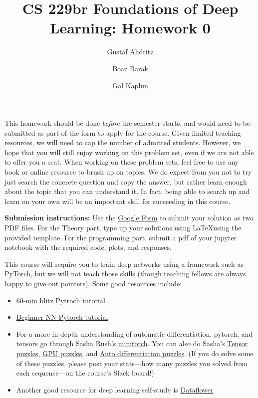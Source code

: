 \documentclass{article}
\title{CS 229br Foundations of Deep Learning: Homework 0}
\author{Gustaf Ahdritz \and Boaz Barak \and Gal Kaplun}
\theoremstyle{definition}
\begin{document}
\date{}
\maketitle{}

This homework should be done \emph{before} the semester starts, and would need to be submitted as part of the form to apply for the course. Given limited teaching resources, we will need to cap the number of admitted students. However, we hope that you will still enjoy working on this problem set, even if we are not able to offer you a seat. When working on these problem sets, feel free to use any book or online resource to brush up on topics. We do expect from you not to try just search the concrete question and copy the answer, but rather learn enough about the topic that you can understand it. In fact, being able to search up and learn on your own will be an important skill for succeeding in this course. 

\medskip 
{\color{blue} \textbf{Submission instructions:} Use the \href{https://forms.gle/gjXbdCVbqxRVu6Bj6}{Google Form} to submit your solution as two PDF files. For the Theory part, type up your solutions using \LaTeX using the provided template. For the programming part, submit a pdf of your jupyter notebook with the required code, plots, and responses.}

\medskip
This course will require you to train deep networks using a framework such as PyTorch, but we will not teach those skills (though teaching fellows are always happy to give out pointers).  Some good resources include:


\begin{itemize}
    \item \href{https://pytorch.org/tutorials/beginner/deep_learning_60min_blitz.html}{60-min blitz} Pytroch tutorial
    \item \href{https://pytorch.org/tutorials/beginner/nn_tutorial.html}{Beginner NN Pytorch tutorial}

    \item For a more in-depth understanding of automatic differentiation, pytorch, and tensors go through Sasha Rush's \href{https://minitorch.github.io/}{minitorch}. You can also do Sasha's \href{https://github.com/srush/Tensor-Puzzles}{Tensor puzzles},  \href{https://github.com/srush/GPU-Puzzles}{GPU puzzles}, and \href{https://github.com/srush/Autodiff-Puzzles}{Auto differentiation puzzles}. (If you do solve some of these puzzles, please post your stats---how many puzzles you solved from each sequence---on the course's Slack board!)

    \item Another good  resource for deep learning self-study is \href{https://dataflowr.github.io/website/}{Dataflower}
    
\end{itemize}
\end{document}
